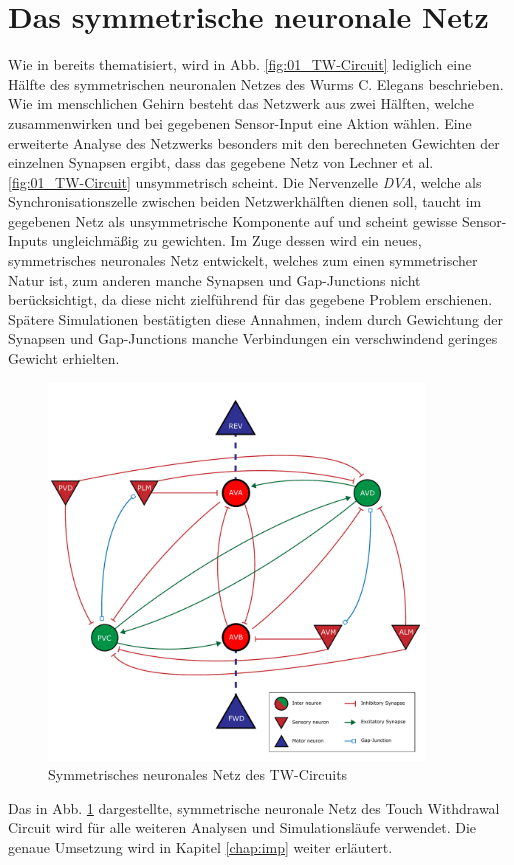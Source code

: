 \section{Das symmetrische neuronale Netz}
\label{sec:my_net}
	Wie in \cite{Wicks1996} bereits thematisiert, wird in Abb. \ref{fig:01_TW-Circuit} lediglich eine Hälfte des symmetrischen neuronalen Netzes des Wurms C. Elegans beschrieben. Wie im menschlichen Gehirn besteht das Netzwerk aus zwei Hälften, welche zusammenwirken und bei gegebenen Sensor-Input eine Aktion wählen. Eine erweiterte Analyse des Netzwerks besonders mit den berechneten Gewichten der einzelnen Synapsen ergibt, dass das gegebene Netz von Lechner et al. \ref{fig:01_TW-Circuit} unsymmetrisch scheint. Die Nervenzelle \textit{DVA}, welche als Synchronisationszelle zwischen beiden Netzwerkhälften dienen soll, taucht im gegebenen Netz als unsymmetrische Komponente auf und scheint gewisse Sensor-Inputs ungleichmäßig zu gewichten. Im Zuge dessen wird ein neues, symmetrisches neuronales Netz entwickelt, welches zum einen symmetrischer Natur ist, zum anderen manche Synapsen und Gap-Junctions nicht berücksichtigt, da diese nicht zielführend für das gegebene Problem erschienen. Spätere Simulationen bestätigten diese Annahmen, indem durch Gewichtung der Synapsen und Gap-Junctions manche Verbindungen ein verschwindend geringes Gewicht erhielten.
	\begin{figure}[H] %
		\centering
		\includegraphics[width=10cm]{figures/chap_neuron/Neural_Net_v3_plain.pdf}
		\caption{Symmetrisches neuronales Netz des TW-Circuits}
		\label{fig:nn_new}
	\end{figure}
	Das in Abb. \ref{fig:nn_new} dargestellte, symmetrische neuronale Netz des Touch Withdrawal Circuit wird für alle weiteren Analysen und Simulationsläufe verwendet. Die genaue Umsetzung wird in Kapitel \ref{chap:imp} weiter erläutert.
	

